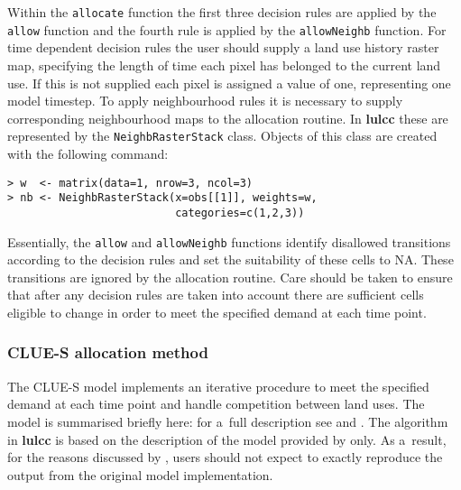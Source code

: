 \documentclass[gmdd, online, hvmath]{copernicus}
\begin{document}
Within the \texttt{allocate} function the first three decision rules are applied by the \texttt{allow} function and the fourth rule is applied by the \texttt{allowNeighb} function. For time dependent decision rules the user should supply a land use history raster map, specifying the length of time each pixel has belonged to the current land use. If this is not supplied each pixel is assigned a value of one, representing one model timestep. To apply neighbourhood rules it is necessary to supply corresponding neighbourhood maps to the allocation routine. In \textbf{lulcc} these are represented by the \texttt{NeighbRasterStack} class. Objects of this class are created with the following command:
\begin{verbatim}
> w  <- matrix(data=1, nrow=3, ncol=3)
> nb <- NeighbRasterStack(x=obs[[1]], weights=w, 
                          categories=c(1,2,3))
\end{verbatim}

Essentially, the \texttt{allow} and \texttt{allowNeighb} functions identify disallowed transitions according to the decision rules and set the suitability of these cells to NA. These transitions are ignored by the allocation routine. Care should be taken to ensure that after any decision rules are taken into account there are sufficient cells eligible to change in order to meet the specified demand at each time point. \\

\subsubsection{CLUE-S allocation method}

The CLUE-S model implements an iterative procedure to meet the specified demand at each time point and handle competition between land uses. The model is summarised briefly here: for a~full description see \citet{verburg2002} and \citet{castella2007}. The algorithm in \textbf{lulcc} is based on the description of the model provided by \citet{verburg2002} only. As a~result, for the reasons discussed by \citet{ince2012}, users should not expect to exactly reproduce the output from the original model implementation. \\
\end{document}
